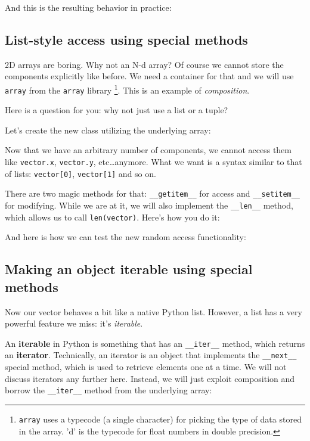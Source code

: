 
\hrulefill

And this is the resulting behavior in practice:



\subsection{List-style access using special methods}
2D arrays are boring. Why not an N-d array? Of course we cannot store the components explicitly like before. We need a container for that and we will use \texttt{array} from the \texttt{array} library \footnote{\texttt{array} uses a typecode (a single character) for picking the type of data stored in the array. 'd' is the typecode for float numbers in double precision.}. This is an example of \textit{composition}.

Here is a question for you: why not just use a list or a tuple?

Let's create the new class utilizing the underlying array:



Now that we have an arbitrary number of components, we cannot access them like \texttt{vector.x}, \texttt{vector.y}, etc\dots anymore. What we want is a syntax similar to that of lists: \texttt{vector[0]}, \texttt{vector[1]} and so on.

There are two magic methods for that: \texttt{\_\_getitem\_\_} for access and \texttt{\_\_setitem\_\_} for modifying. While we are at it, we will also implement the \texttt{\_\_len\_\_} method, which allows us to call \texttt{len(vector)}. Here's how you do it:


\hrulefill

And here is how we can test the new random access functionality:



\subsection{Making an object iterable using special methods}\label{sec:special_iterable}
Now our vector behaves a bit like a native Python list. However, a list has a very powerful feature we miss: it's \textit{iterable}.

An \textbf{iterable} in Python is something that has an \texttt{\_\_iter\_\_} method, which returns an \textbf{iterator}. Technically, an iterator is an object that implements the \texttt{\_\_next\_\_} special method, which is used to retrieve elements one at a time. We will not discuss iterators any further here. Instead, we will just exploit composition and borrow the \texttt{\_\_iter\_\_} method from the underlying array:

